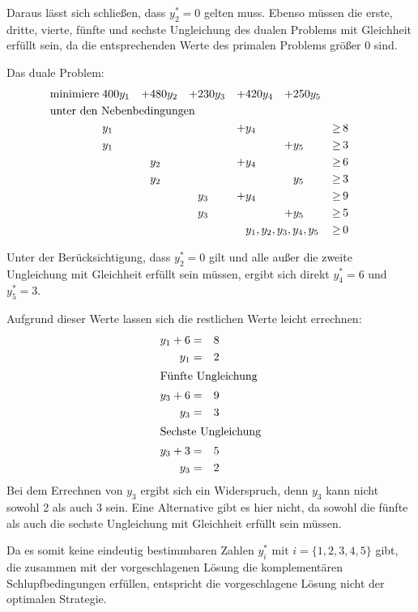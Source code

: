 \documentclass[10pt,a4paper,oneside,ngerman,numbers=noenddot]{scrartcl}
\begin{document}
	Daraus lässt sich schließen, dass $y_{2}^{*} = 0$ gelten muss. Ebenso müssen die erste, dritte, vierte, fünfte und sechste Ungleichung des dualen Problems mit Gleichheit erfüllt sein, da die entsprechenden Werte des primalen Problems größer $0$ sind.
	
	Das duale Problem:
	\begin{alignat*}{6}
		\text{minimiere}\; & 400y_{1} &+& 480y_{2} &+& 230y_{3} &+& 420y_{4} &+& 250y_{5} &&  \\
		\multicolumn{12}{l}{\text{unter den Nebenbedingungen}} && \\
		& y_{1} && && &+& y_{4} && &\geq &\, 8 \\
		& y_{1} && && && &+& y_{5} &\geq &\, 3 \\
		& && y_{2} && &+& y_{4} && &\geq &\, 6 \\
		& && y_{2} && && && y_{5} &\geq &\, 3 \\
		& && && y_{3} &+& y_{4} && &\geq &\, 9 \\
		& && && y_{3} && &+& y_{5} &\geq &\, 5 \\		
		\multicolumn{10}{r}{$y_{1}, y_{2}, y_{3}, y_{4}, y_{5}$} \,&\geq &\, 0
	\end{alignat*}
	
	Unter der Berücksichtigung, dass $y_{2}^{*} = 0$ gilt und alle außer die zweite Ungleichung mit Gleichheit erfüllt sein müssen, ergibt sich direkt $y_{4}^{*} = 6$ und $y_{5}^{*} = 3$.
	
	Aufgrund dieser Werte lassen sich die restlichen Werte leicht errechnen:
	\begin{alignat*}{2}
		y_{1} + 6 &=& 8 \\
		y_{1} &=& 2 \\
		\intertext{Fünfte Ungleichung}
		y_{3} + 6 &=& 9 \\
		y_{3} &=& 3 \\
		\intertext{Sechste Ungleichung}
		y_{3} + 3 &=& 5 \\
		y_{3} &=& 2
	\end{alignat*}
	Bei dem Errechnen von $y_{3}$ ergibt sich ein Widerspruch, denn $y_{3}$ kann nicht sowohl 2 als auch 3 sein. Eine Alternative gibt es hier nicht, da sowohl die fünfte als auch die sechste Ungleichung mit Gleichheit erfüllt sein müssen.
	
	Da es somit keine eindeutig bestimmbaren Zahlen $y_{i}^{*}$ mit $i = \{1,2,3,4,5\}$ gibt, die zusammen mit der vorgeschlagenen Lösung die komplementären Schlupfbedingungen erfüllen, entspricht die vorgeschlagene Lösung nicht der optimalen Strategie.
\end{document}

